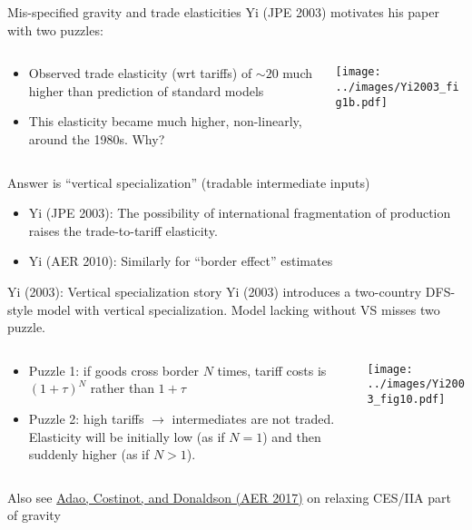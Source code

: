 \documentclass[10pt,notes=hide,aspectratio=169]{beamer}
\begin{document}
\begin{frame}{Mis-specified gravity and trade elasticities}
Yi (JPE 2003) motivates his paper with two puzzles:
\begin{columns}
\begin{column}{.49\textwidth}
\begin{itemize}
\item Observed trade elasticity (wrt tariffs) of $\sim 20$ much higher than prediction of standard models
\item This elasticity became much higher, non-linearly, around the 1980s. Why?
\end{itemize}
\end{column}
\begin{column}{.5\textwidth}
\texttt{[image: ../images/Yi2003\_fig1b.pdf]}
\end{column}
\end{columns}
\vspace{2mm}
Answer is ``vertical specialization'' (tradable intermediate inputs)
\begin{itemize}
	\item Yi (JPE 2003): The possibility of international fragmentation of production raises the trade-to-tariff elasticity.
	\item Yi (AER 2010): Similarly for ``border effect'' estimates
\end{itemize}
\end{frame}
\begin{frame}{Yi (2003): Vertical specialization story}
Yi (2003) introduces a two-country DFS-style model with vertical specialization. Model lacking without VS misses two puzzle.
\begin{columns}
\begin{column}{.46\textwidth}
\begin{itemize}
	\item Puzzle 1: if goods cross border $N$ times,
	tariff costs is $(1+\tau)^N$ rather than $1+\tau$
	\item Puzzle 2: high tariffs $\to$ intermediates are not traded.
	Elasticity will be initially low (as if $N = 1$) and then suddenly higher (as if $N > 1$).
\end{itemize}
\end{column}
\begin{column}{.52\textwidth}
\texttt{[image: ../images/Yi2003\_fig10.pdf]}
\end{column}
\end{columns}
Also see \href{https://www.aeaweb.org/articles?id=10.1257/aer.20150956}{Adao, Costinot, and Donaldson (AER 2017)} on relaxing CES/IIA part of gravity
\end{frame}
\end{document}
